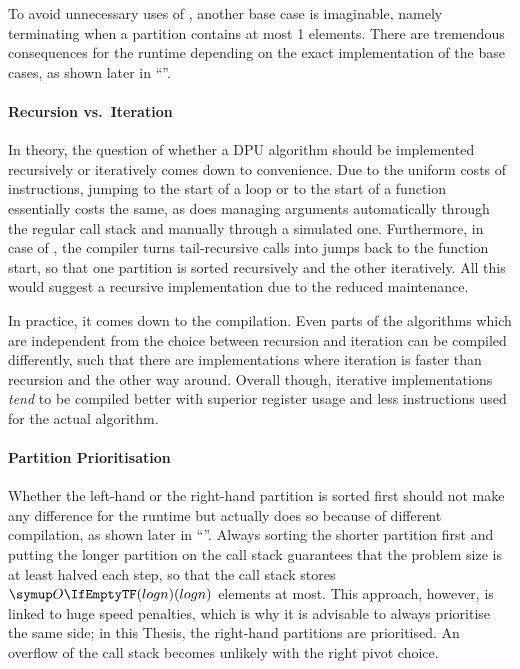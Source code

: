 To avoid unnecessary uses of \IS{}, another base case is imaginable, namely terminating when a partition contains at most 1 elements.
There are tremendous consequences for the runtime depending on the exact implementation of the base cases, as shown later in \enquote{}.


\paragraph{Recursion vs.\ Iteration}
In theory, the question of whether a DPU algorithm should be implemented recursively or iteratively comes down to convenience.
Due to the uniform costs of instructions, jumping to the start of a loop or to the start of a function essentially costs the same, as does managing arguments automatically through the regular call stack and manually through a simulated one.
Furthermore, in case of \QS{}, the compiler turns tail-recursive calls into jumps back to the function start, so that one partition is sorted recursively and the other iteratively.
All this would suggest a recursive implementation due to the reduced maintenance.

In practice, it comes down to the compilation.
Even parts of the algorithms which are independent from the choice between recursion and iteration can be compiled differently, such that there are implementations where iteration is faster than recursion and the other way around.
Overall though, iterative implementations \emph{tend} to be compiled better with superior register usage and less instructions used for the actual \QS{} algorithm.


\paragraph{Partition Prioritisation}
Whether the left-hand or the right-hand partition is sorted first should not make any difference for the runtime but actually does so because of different compilation, as shown later in \enquote{}.
Always sorting the shorter partition first and putting the longer partition on the call stack guarantees that the problem size is at least halved each step, so that the call stack stores \(\bigoh{log n}\) elements at most.
This approach, however, is linked to huge speed penalties, which is why it is advisable to always prioritise the same side;
in this Thesis, the right-hand partitions are prioritised.
An overflow of the call stack becomes unlikely with the right pivot choice.



